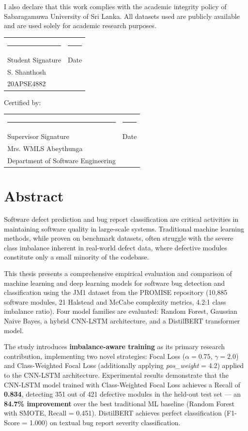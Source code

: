 \documentclass[12pt,a4paper,oneside]{report}
\begin{document}
I also declare that this work complies with the academic integrity policy of Sabaragamuwa University of Sri Lanka. All datasets used are publicly available and are used solely for academic research purposes.

\vspace{30mm}
\noindent
\begin{tabular}{p{70mm}p{70mm}}
  \rule{65mm}{0.4pt}  & \rule{65mm}{0.4pt} \\
  Student Signature    & Date \\[6mm]
  S. Shanthosh         & \\
  20APSE4882
\end{tabular}

\vspace{15mm}
\noindent Certified by:

\vspace{15mm}
\noindent
\begin{tabular}{p{70mm}p{70mm}}
  \rule{65mm}{0.4pt}  & \rule{65mm}{0.4pt} \\
  Supervisor Signature & Date \\[6mm]
  Mrs. WMLS Abeythunga &  \\
  Department of Software Engineering &
\end{tabular}
\clearpage

\chapter*{Abstract}

Software defect prediction and bug report classification are critical activities in maintaining software quality in large-scale systems. Traditional machine learning methods, while proven on benchmark datasets, often struggle with the severe class imbalance inherent in real-world defect data, where defective modules constitute only a small minority of the codebase.

This thesis presents a comprehensive empirical evaluation and comparison of machine learning and deep learning models for software bug detection and classification using the JM1 dataset from the PROMISE repository (10,885 software modules, 21 Halstead and McCabe complexity metrics, 4.2:1 class imbalance ratio). Four model families are evaluated: Random Forest, Gaussian Naive Bayes, a hybrid CNN-LSTM architecture, and a DistilBERT transformer model.

The study introduces \textbf{imbalance-aware training} as its primary research contribution, implementing two novel strategies: Focal Loss ($\alpha = 0.75$, $\gamma = 2.0$) and Class-Weighted Focal Loss (additionally applying \textit{pos\_weight} = 4.2) applied to the CNN-LSTM architecture. Experimental results demonstrate that the CNN-LSTM model trained with Class-Weighted Focal Loss achieves a Recall of \textbf{0.834}, detecting 351 out of 421 defective modules in the held-out test set --- an \textbf{84.7\% improvement} over the best traditional ML baseline (Random Forest with SMOTE, Recall = 0.451). DistilBERT achieves perfect classification (F1-Score = 1.000) on textual bug report severity classification.
\end{document}

